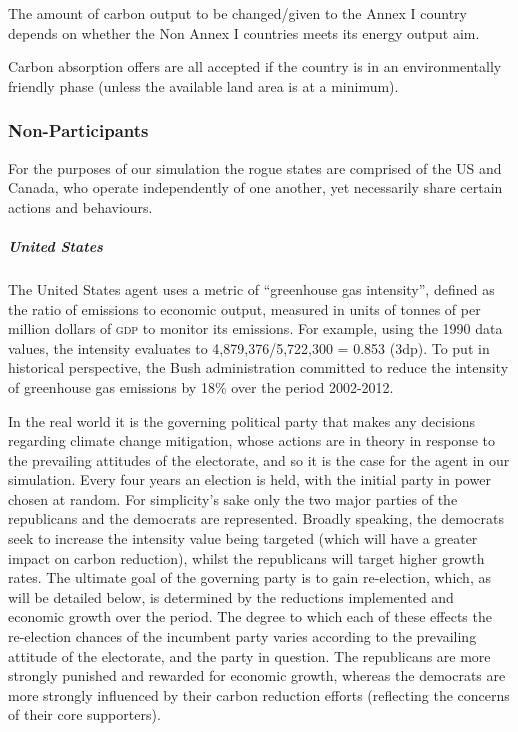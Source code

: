 The amount of carbon output to be changed/given to the Annex I country depends on whether the Non Annex I countries meets its energy output aim.

Carbon absorption offers are all accepted if the country is in an environmentally friendly phase (unless the available land area is at a minimum). 

\subsubsection{Non-Participants}

For the purposes of our simulation the rogue states are comprised of the US and Canada, who operate independently of one another, yet necessarily share certain actions and behaviours. 

\subparagraph{United States}

The United States agent uses a metric of ``greenhouse gas intensity'', defined as the ratio of emissions to economic output, measured in units of tonnes of \CO per million dollars of \textsc{gdp} to monitor its emissions. For example, using the 1990 data values, the intensity evaluates to 4,879,376/5,722,300 = 0.853 (3dp). To put in historical perspective, the Bush administration committed to reduce the intensity of greenhouse gas emissions by 18\% over the period 2002-2012.

In the real world it is the governing political party that makes any decisions regarding climate change mitigation, whose actions are in theory in response to the prevailing attitudes of the electorate, and so it is the case for the agent in our simulation. Every four years an election is held, with the initial party in power chosen at random. For simplicity's sake only the two major parties of the republicans and the democrats are represented. Broadly speaking, the democrats seek to increase the intensity value being targeted (which will have a greater impact on carbon reduction), whilst the republicans will target higher growth rates. The ultimate goal of the governing party is to gain re-election, which, as will be detailed below, is determined by the reductions implemented and economic growth over the period. The degree to which each of these effects the re-election chances of the incumbent party varies according to the prevailing attitude of the electorate, and the party in question. The republicans are more strongly punished and rewarded for economic growth, whereas the democrats are more strongly influenced by their carbon reduction efforts (reflecting the concerns of their core supporters). 

